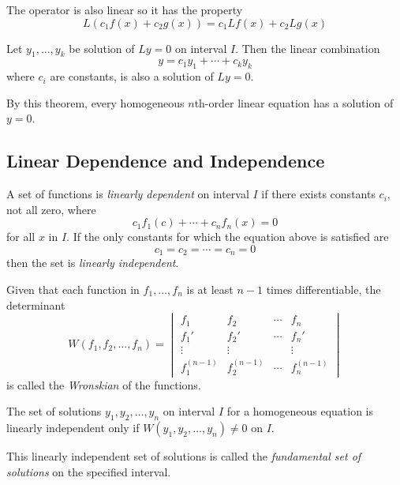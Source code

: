 The operator is also linear so it has the property
\[
    L(c_1f(x) + c_2g(x)) = c_1Lf(x) + c_2Lg(x)
\]

\begin{theorem}
    Let $y_1, \ldots, y_k$ be solution of $Ly = 0$ on interval $I$. Then the linear combination
    \[
        y = c_1 y_1 + \cdots + c_k y_k
    \]
    where $c_i$ are constants, is also a solution of $Ly = 0$.
\end{theorem}
By this theorem, every homogeneous $n$th-order linear equation has a solution of $y = 0$.

\subsection{Linear Dependence and Independence}

\begin{definition}
    A set of functions is \textit{linearly dependent} on interval $I$ if there exists constants $c_i$, not all zero, where
    \[
        c_1 f_1(c) + \cdots + c_n f_n(x) = 0
    \]
    for all $x$ in $I$. If the only constants for which the equation above is satisfied are
    \[
        c_1 = c_2 = \cdots = c_n = 0
    \]
    then the set is \textit{linearly independent}.
\end{definition}

\begin{definition}[Wronskian]
    Given that each function in $f_1, \ldots, f_n$ is at least $n - 1$ times differentiable, the determinant
    \[
        W(f_1, f_2, \ldots, f_n) = \begin{vmatrix}
            f_1 & f_2 & \cdots & f_n \\
            f_1' & f_2' & \cdots & f_n' \\
            \vdots & \vdots & & \vdots \\
            f_1^{(n - 1)} & f_2^{(n - 1)} & \cdots & f_n^{(n - 1)}
        \end{vmatrix}
    \]
    is called the \textit{Wronskian} of the functions.
\end{definition}

The set of solutions $y_1, y_2, \ldots, y_n$ on interval $I$ for a homogeneous equation is linearly independent only if $W(y_1, y_2, \ldots, y_n) \ne 0$ on $I$.

This linearly independent set of solutions is called the \textit{fundamental set of solutions} on the specified interval.

